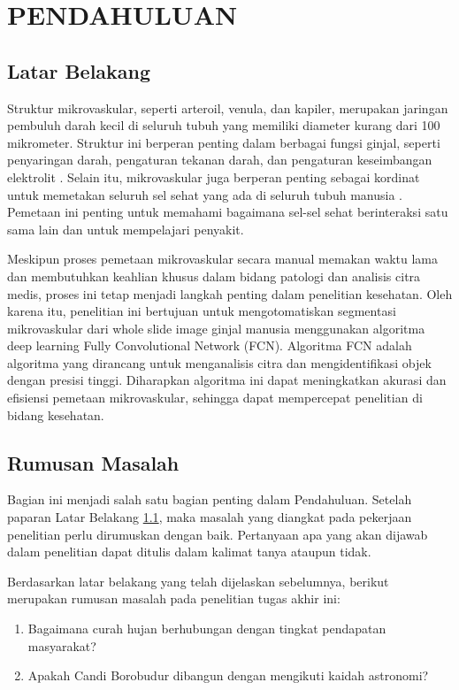 \chapter{PENDAHULUAN}
\section{Latar Belakang}
\label{section:latarbelakang}
\noindent Struktur mikrovaskular, seperti arteroil, venula, dan kapiler, merupakan jaringan pembuluh darah kecil di seluruh tubuh yang memiliki diameter kurang dari 100 mikrometer. Struktur ini berperan penting dalam berbagai fungsi ginjal, seperti penyaringan darah, pengaturan tekanan darah, dan pengaturan keseimbangan elektrolit \cite{hu_multi-scale_2023}. Selain itu, mikrovaskular juga berperan penting sebagai kordinat untuk memetakan seluruh sel sehat yang ada di seluruh tubuh manusia \cite{}. Pemetaan ini penting untuk memahami bagaimana sel-sel sehat berinteraksi satu sama lain dan untuk mempelajari penyakit.


\noindent Meskipun proses pemetaan mikrovaskular secara manual memakan waktu lama dan membutuhkan keahlian khusus dalam bidang patologi dan analisis citra medis, proses ini tetap menjadi langkah penting dalam penelitian kesehatan. Oleh karena itu, penelitian ini bertujuan untuk mengotomatiskan segmentasi mikrovaskular dari whole slide image ginjal manusia menggunakan algoritma deep learning Fully Convolutional Network (FCN). Algoritma FCN adalah algoritma yang dirancang untuk menganalisis citra dan mengidentifikasi objek dengan presisi tinggi. Diharapkan algoritma ini dapat meningkatkan akurasi dan efisiensi pemetaan mikrovaskular, sehingga dapat mempercepat penelitian di bidang kesehatan.

\section{Rumusan Masalah}
\noindent Bagian ini menjadi salah satu bagian penting dalam Pendahuluan. Setelah paparan Latar Belakang \ref{section:latarbelakang}, maka masalah yang diangkat pada pekerjaan penelitian perlu dirumuskan dengan baik. Pertanyaan apa yang akan dijawab dalam penelitian dapat ditulis dalam kalimat tanya ataupun tidak.

\noindent Berdasarkan latar belakang yang telah dijelaskan sebelumnya, berikut merupakan rumusan masalah pada penelitian tugas akhir ini:
\begin{enumerate}
    \item Bagaimana curah hujan berhubungan dengan tingkat pendapatan masyarakat?
    \item Apakah Candi Borobudur dibangun dengan mengikuti kaidah astronomi?
\end{enumerate}

